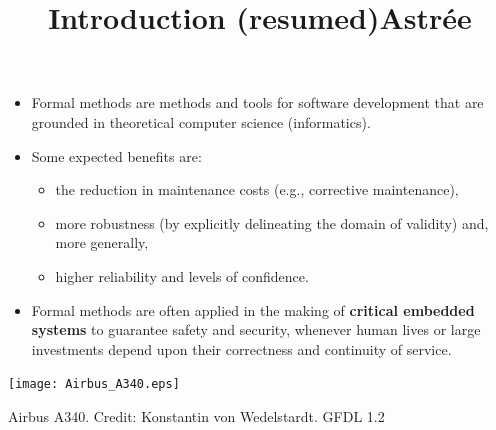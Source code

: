 \documentclass[wide]{slides}
\begin{document}
\begin{slide}
  \title{Introduction (resumed)}

  \begin{itemize}

    \item Formal methods are methods and tools for software
      development that are grounded in theoretical computer science
      (informatics).

    \item Some expected benefits are:

      \begin{itemize}

        \item the reduction in maintenance costs (e.g., corrective
          maintenance),

        \item more robustness (by explicitly delineating the domain of
          validity) and, more generally,

        \item higher reliability and levels of confidence.

      \end{itemize}

    \item Formal methods are often applied in the making of
      \textbf{critical embedded systems} to guarantee safety and
      security, whenever human lives or large investments depend upon
      their correctness and continuity of service.

  \end{itemize}
\end{slide}

\begin{slide}
  \title{Astr\'ee}

  \begin{center}
    \texttt{[image: Airbus\_A340.eps]}
  \end{center}

    \centerline{Airbus A340. Credit: Konstantin von Wedelstardt. GFDL
      1.2}

\end{slide}
\end{document}
